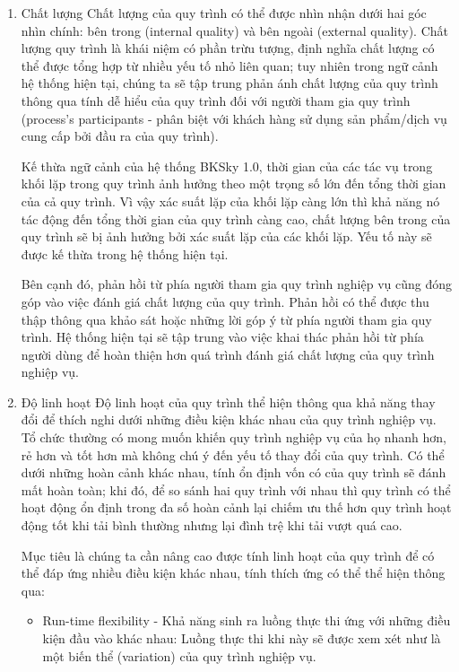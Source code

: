 \begin{enumerate}[label=(\alph*)]
        \item Chất lượng
        \newline
    Chất lượng của quy trình có thể được nhìn nhận dưới hai góc nhìn chính: bên trong (internal quality) và bên ngoài (external quality). Chất lượng quy trình là khái niệm có phần trừu tượng, định nghĩa chất lượng có thể được tổng hợp từ nhiều yếu tố nhỏ liên quan; tuy nhiên trong ngữ cảnh hệ thống hiện tại, chúng ta sẽ tập trung phản ánh chất lượng của quy trình thông qua tính dễ hiểu của quy trình đối với người tham gia quy trình (process's participants - phân biệt với khách hàng sử dụng sản phẩm/dịch vụ cung cấp bởi đầu ra của quy trình).
    
    Kế thừa ngữ cảnh của hệ thống BKSky 1.0, thời gian của các tác vụ trong khối lặp trong quy trình ảnh hưởng theo một trọng số lớn đến tổng thời gian của cả quy trình. Vì vậy xác suất lặp của khối lặp càng lớn thì khả năng nó tác động đến tổng thời gian của quy trình càng cao, chất lượng bên trong của quy trình sẽ bị ảnh hưởng bởi xác suất lặp của các khối lặp. Yếu tố này sẽ được kế thừa trong hệ thống hiện tại.

    Bên cạnh đó, phản hồi từ phía người tham gia quy trình nghiệp vụ cũng đóng góp vào việc đánh giá chất lượng của quy trình. Phản hồi có thể được thu thập thông qua khảo sát hoặc những lời góp ý từ phía người tham gia quy trình. Hệ thống hiện tại sẽ tập trung vào việc khai thác phản hồi từ phía người dùng để hoàn thiện hơn quá trình đánh giá chất lượng của quy trình nghiệp vụ.
    
        \item Độ linh hoạt
        \newline
    Độ linh hoạt của quy trình thể hiện thông qua khả năng thay đổi để thích nghi dưới những điều kiện khác nhau của quy trình nghiệp vụ. Tổ chức thường có mong muốn khiến quy trình nghiệp vụ của họ nhanh hơn, rẻ hơn và tốt hơn mà không chú ý đến yếu tố thay đổi của quy trình. Có thể dưới những hoàn cảnh khác nhau, tính ổn định vốn có của quy trình sẽ đánh mất hoàn toàn; khi đó, để so sánh hai quy trình với nhau thì quy trình có thể hoạt động ổn định trong đa số hoàn cảnh lại chiếm ưu thế hơn quy trình hoạt động tốt khi tải bình thường nhưng lại đình trệ khi tải vượt quá cao.

    Mục tiêu là chúng ta cần nâng cao được tính linh hoạt của quy trình để có thể đáp ứng nhiều điều kiện khác nhau, tính thích ứng có thể thể hiện thông qua:

    \begin{itemize}
        \item Run-time flexibility - Khả năng sinh ra luồng thực thi ứng với những điều kiện đầu vào khác nhau: Luồng thực thi khi này sẽ được xem xét như là một biến thể (variation) của quy trình nghiệp vụ.


\end{itemize}
\end{enumerate}
